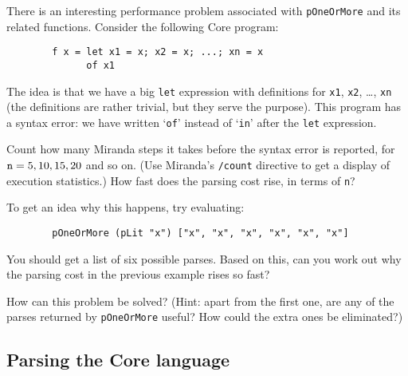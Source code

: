 There is an interesting performance problem associated with \mbox{\tt pOneOrMore}
and its related functions.  Consider the following Core program:
\begin{verbatim}
        f x = let x1 = x; x2 = x; ...; xn = x
              of x1
\end{verbatim}
The idea is that we have a big \mbox{\tt let} expression with definitions for
\mbox{\tt x1}, \mbox{\tt x2}, \ldots, \mbox{\tt xn} (the definitions are rather trivial, but
they serve the purpose).
This program has a syntax error: we have written `\mbox{\tt of}' instead of `\mbox{\tt in}'
after the \mbox{\tt let} expression.
\begin{exercise}
\advanced
Count how many Miranda steps it takes before the syntax error is reported,
for $\mbox{\tt n} =5, 10, 15, 20$ and so on.  (Use Miranda's \mbox{\tt /count} directive to
get a display of execution statistics.)  How fast does the parsing cost
rise, in terms of \mbox{\tt n}?

To get an idea why this happens, try evaluating:
\begin{verbatim}
        pOneOrMore (pLit "x") ["x", "x", "x", "x", "x", "x"]
\end{verbatim}
You should get a list of six possible parses.  Based on this, can you work
out why the parsing cost in the previous example rises so fast?

How can this problem be solved?  (Hint: apart from the first one,
are any of the parses returned by \mbox{\tt pOneOrMore} useful?
How could the extra ones be eliminated?)
\end{exercise}

\subsection{Parsing the Core language}


